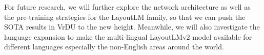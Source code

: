 \documentclass{article} \usepackage{iclr2021_conference,times}
\begin{document}
For future research, we will further explore the network architecture as well as the pre-training strategies for the LayoutLM family, so that we can push the SOTA results in VrDU to the new height. Meanwhile, we will also investigate the language expansion to make the multi-lingual LayoutLMv2 model available for different languages especially the non-English areas around the world.








\end{document}
